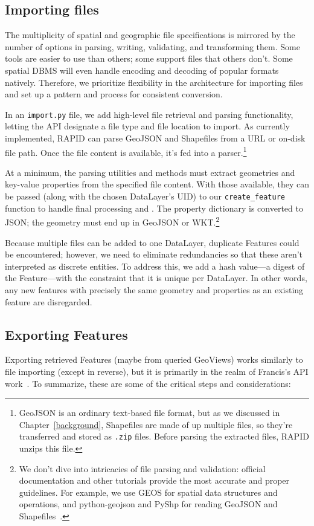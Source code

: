 \subsection{Importing files}
The multiplicity of spatial and geographic file specifications is mirrored by the number of options in parsing, writing, validating, and transforming them. Some tools are easier to use than others; some support files that others don't. Some spatial DBMS will even handle encoding and decoding of popular formats natively. Therefore, we prioritize flexibility in the architecture for importing files and set up a pattern and process for consistent conversion.
 
In an \texttt{import.py} file, we add high-level file retrieval and parsing functionality, letting the API designate a file type and file location to import. As currently implemented, RAPID can parse GeoJSON and Shapefiles from a URL or on-disk file path. Once the file content is available, it's fed into a parser.\footnote{GeoJSON is an ordinary text-based file format, but as we discussed in Chapter~\ref{background}, Shapefiles are made of up multiple files, so they're transferred and stored as \texttt{.zip} files. Before parsing the extracted files, RAPID unzips this file.}

At a minimum, the parsing utilities and methods must extract geometries and key-value properties from the specified file content. With those available, they can be passed (along with the chosen DataLayer's UID) to our \texttt{create\_feature} function to handle final processing and . The property dictionary is converted to JSON; the geometry must end up in GeoJSON or WKT.\footnote{We don't dive into intricacies of file parsing and validation: official documentation and other tutorials provide the most accurate and proper guidelines. For example, we use GEOS for spatial data structures and operations, and python-geojson and PyShp for reading GeoJSON and Shapefiles~\cite{1,2,3}.}

Because multiple files can be added to one DataLayer, duplicate Features could be encountered; however, we need to eliminate redundancies so that these aren't interpreted as discrete entities. To address this, we add a hash value---a digest of the Feature---with the constraint that it is unique per DataLayer. In other words, any new features with precisely the same geometry and properties as an existing feature are disregarded.


\subsection{Exporting Features}
Exporting retrieved Features (maybe from queried GeoViews) works similarly to file importing (except in reverse), but it is primarily in the realm of Francis's API work~\cite{Francis}. To summarize, these are some of the critical steps and considerations:

